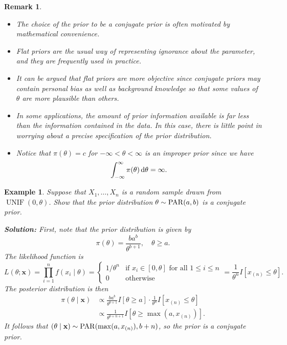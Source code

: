 \documentclass[10pt]{article}
\newcommand{\dd}{\,{\rm d}}
\DeclareMathOperator{\UNIF}{UNIF}
\theoremstyle{newstyle}
\newtheorem{remark}[thm]{Remark}
\newtheorem{exmp}[thm]{Example}
\begin{document}
\begin{remark}~
\begin{itemize}
    \item The choice of the prior to be a conjugate prior is often motivated by mathematical convenience.
    \item Flat priors are the usual way of representing ignorance about the parameter, and they are 
    frequently used in practice. 
    \item It can be argued that flat priors are more objective since conjugate priors may 
    contain personal bias as well as background knowledge so that some values of $\theta$ are 
    more plausible than others. 
    \item In some applications, the amount of prior information available is far less than the 
    information contained in the data. In this case, there is little point in worrying about 
    a precise specification of the prior distribution. 
    \item Notice that $\pi(\theta) = c$ for $-\infty < \theta < \infty$ is an improper prior since 
    we have 
    \[ \int_{-\infty}^\infty \pi(\theta)\dd \theta = \infty. \]
\end{itemize}
\end{remark}

\begin{exmp}
Suppose that $X_1, \dots, X_n$ is a random sample drawn from $\UNIF(0, \theta)$. Show that 
the prior distribution $\theta \sim {\rm PAR}(a, b)$ is a conjugate prior. 

{\color{blue}
{\bf Solution:}
First, note that the prior distribution is given by 
\[ \pi(\theta) = \frac{ba^b}{\theta^{b+1}}, \quad \theta \geq a. \]
The likelihood function is 
\[ L(\theta; \mathbf x) = \prod_{i=1}^n f(x_i \mid \theta) 
= \begin{cases} 1/\theta^n & \text{if } x_i \in [0, \theta] \text{ for all } 1 \leq i \leq n \\
0 & \text{otherwise} \end{cases} = \frac{1}{\theta^n} I[x_{(n)} \leq \theta]. \]
The posterior distribution is then 
\begin{align*}
    \pi(\theta \mid \mathbf x) 
    &\propto \frac{ba^b}{\theta^{b+1}} I[\theta \geq a] \cdot \frac{1}{\theta^n} 
    I[x_{(n)} \leq \theta] \\
    &\propto \frac{1}{\theta^{b+n+1}} I[\theta \geq \max(a, x_{(n)})].
\end{align*}
It follows that $(\theta \mid \mathbf x) \sim {\rm PAR}(\max(a, x_{(n)}), b+n)$, so the prior is a 
conjugate prior.}
\end{exmp}
\end{document}
